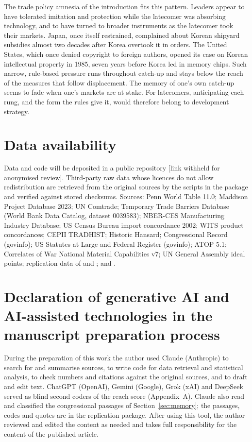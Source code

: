 \documentclass[review,authoryear,12pt]{elsarticle}
\begin{document}
The trade policy amnesia of the introduction fits this pattern. Leaders appear to have tolerated imitation and protection while the latecomer was absorbing technology, and to have turned to broader instruments as the latecomer took their markets. Japan, once itself restrained, complained about Korean shipyard subsidies almost two decades after Korea overtook it in orders. The United States, which once denied copyright to foreign authors, opened its case on Korean intellectual property in 1985, seven years before Korea led in memory chips. Such narrow, rule-based pressure runs throughout catch-up and stays below the reach of the measures that follow displacement. The memory of one's own catch-up seems to fade when one's markets are at stake. For latecomers, anticipating each rung, and the form the rules give it, would therefore belong to development strategy.

\section*{Data availability}
Data and code will be deposited in a public repository [link withheld for anonymised review]. Third-party raw data whose licences do not allow redistribution are retrieved from the original sources by the scripts in the package and verified against stored checksums. Sources: Penn World Table 11.0; Maddison Project Database 2023; UN Comtrade; Temporary Trade Barriers Database (World Bank Data Catalog, dataset 0039583); NBER-CES Manufacturing Industry Database; US Census Bureau import concordance 2002; WITS product concordances; CEPII TRADHIST; Historic Hansard; Congressional Record (govinfo); US Statutes at Large and Federal Register (govinfo); ATOP 5.1; Correlates of War National Material Capabilities v7; UN General Assembly ideal points; replication data of \citet{stubbs2020} and \citet{stubbs2016}; and \citet{tyszynski1951}.

\section*{Declaration of generative AI and AI-assisted technologies in the manuscript preparation process}
During the preparation of this work the author used Claude (Anthropic) to search for and summarise sources, to write code for data retrieval and statistical analysis, to check numbers and citations against the original sources, and to draft and edit text. ChatGPT (OpenAI), Gemini (Google), Grok (xAI) and DeepSeek served as blind second coders of the reach score (Appendix~A). Claude also read and classified the congressional passages of Section~\ref{sec:memory}; the passages, codes and quotes are in the replication package. After using this tool, the author reviewed and edited the content as needed and takes full responsibility for the content of the published article.




\clearpage
\appendix
\begingroup\renewcommand{\baselinestretch}{1}\selectfont

\endgroup
\end{document}
